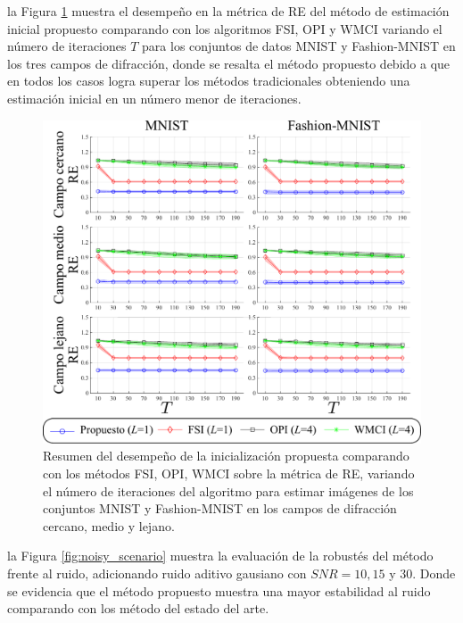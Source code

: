 la Figura \ref{fig:results_initializations} muestra el desempeño en la métrica de RE del método de estimación inicial propuesto  comparando con los algoritmos FSI, OPI y WMCI variando el número de iteraciones $T$ para los conjuntos de datos MNIST y Fashion-MNIST en los tres campos de difracción, donde se resalta el método propuesto debido a que en todos los casos logra superar los métodos tradicionales obteniendo una estimación inicial en un número menor de iteraciones.

\begin{figure}[h!]
\centering
         \includegraphics[width=0.8\linewidth]{images/resultados/results_initializations.pdf}
        \caption{Resumen del desempeño de la inicialización propuesta comparando con los métodos FSI, OPI, WMCI sobre la métrica de RE, variando el número de iteraciones del algoritmo para estimar imágenes de los conjuntos MNIST y Fashion-MNIST en los campos de difracción cercano, medio y lejano.}
        \label{fig:results_initializations}
\end{figure}



la Figura \ref{fig:noisy_scenario} muestra la evaluación de la robustés del método frente al ruido, adicionando ruido aditivo gausiano con $SNR = 10, 15$ y $30$. Donde se evidencia que el método propuesto muestra una mayor estabilidad al ruido comparando con los método del estado del arte.

